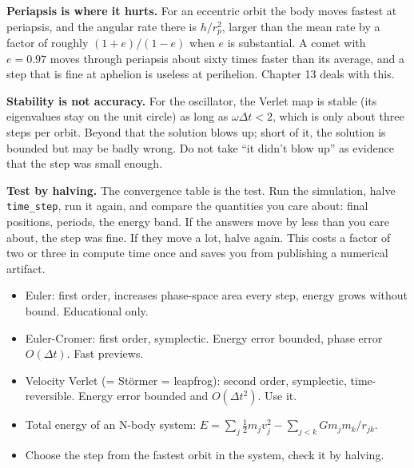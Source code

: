 \documentclass[
  10.5pt,
  letterpaper,
]{scrbook}
\providecommand{\tightlist}{%
  \setlength{\itemsep}{0pt}\setlength{\parskip}{0pt}}
\theoremstyle{plain}
\theoremstyle{remark}
\begin{document}
\textbf{Periapsis is where it hurts.} For an eccentric orbit the body
moves fastest at periapsis, and the angular rate there is \(h/r_p^2\),
larger than the mean rate by a factor of roughly \((1+e)/(1-e)\) when
\(e\) is substantial. A comet with \(e = 0.97\) moves through periapsis
about sixty times faster than its average, and a step that is fine at
aphelion is useless at perihelion. Chapter 13 deals with this.

\textbf{Stability is not accuracy.} For the oscillator, the Verlet map
is stable (its eigenvalues stay on the unit circle) as long as
\(\omega\Delta t < 2\), which is only about three steps per orbit.
Beyond that the solution blows up; short of it, the solution is bounded
but may be badly wrong. Do not take ``it didn't blow up'' as evidence
that the step was small enough.

\textbf{Test by halving.} The convergence table is the test. Run the
simulation, halve \texttt{time\_step}, run it again, and compare the
quantities you care about: final positions, periods, the energy band. If
the answers move by less than you care about, the step was fine. If they
move a lot, halve again. This costs a factor of two or three in compute
time once and saves you from publishing a numerical artifact.

\begin{tcolorbox}[enhanced jigsaw, arc=.35mm, bottomrule=.15mm, bottomtitle=1mm, breakable, colback=white, colbacktitle=quarto-callout-tip-color!10!white, colframe=quarto-callout-tip-color-frame, coltitle=black, left=2mm, leftrule=.75mm, opacityback=0, opacitybacktitle=0.6, rightrule=.15mm, title={Key results}, titlerule=0mm, toprule=.15mm, toptitle=1mm]

\begin{itemize}
\tightlist
\item
  Euler: first order, increases phase-space area every step, energy
  grows without bound. Educational only.
\item
  Euler-Cromer: first order, symplectic. Energy error bounded, phase
  error \(O(\Delta t)\). Fast previews.
\item
  Velocity Verlet (= Störmer = leapfrog): second order, symplectic,
  time-reversible. Energy error bounded and \(O(\Delta t^2)\). Use it.
\item
  Total energy of an N-body system:
  \(E = \sum_j \tfrac12 m_j v_j^2 - \sum_{j<k} G m_j m_k / r_{jk}\).
\item
  Choose the step from the fastest orbit in the system, check it by
  halving.
\end{itemize}

\end{tcolorbox}
\end{document}
